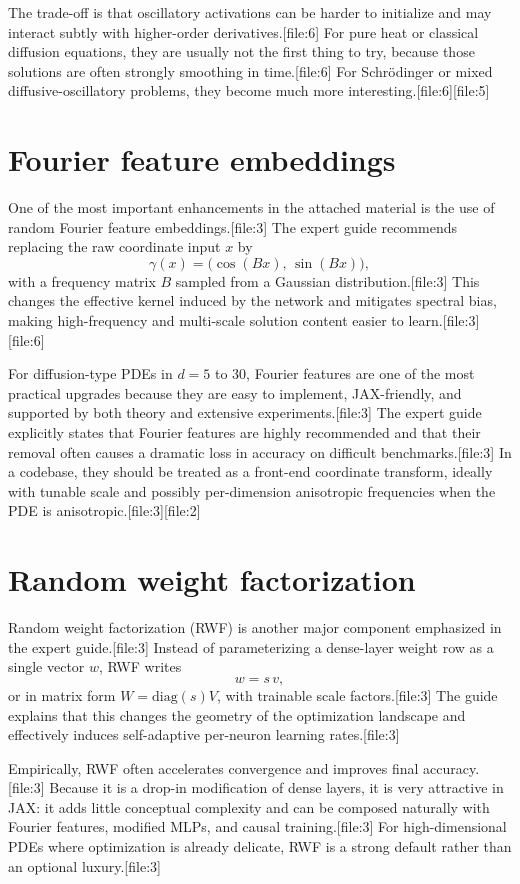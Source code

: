 \documentclass[11pt]{report}
\begin{document}
The trade-off is that oscillatory activations can be harder to initialize and may interact subtly with higher-order derivatives.[file:6]  
For pure heat or classical diffusion equations, they are usually not the first thing to try, because those solutions are often strongly smoothing in time.[file:6]  
For Schr\"odinger or mixed diffusive-oscillatory problems, they become much more interesting.[file:6][file:5]

\section{Fourier feature embeddings}

One of the most important enhancements in the attached material is the use of random Fourier feature embeddings.[file:3]  
The expert guide recommends replacing the raw coordinate input \(x\) by
\[
\gamma(x) = \bigl(\cos(Bx),\, \sin(Bx)\bigr),
\]
with a frequency matrix \(B\) sampled from a Gaussian distribution.[file:3]  
This changes the effective kernel induced by the network and mitigates spectral bias, making high-frequency and multi-scale solution content easier to learn.[file:3][file:6]

For diffusion-type PDEs in \(d=5\) to \(30\), Fourier features are one of the most practical upgrades because they are easy to implement, JAX-friendly, and supported by both theory and extensive experiments.[file:3]  
The expert guide explicitly states that Fourier features are highly recommended and that their removal often causes a dramatic loss in accuracy on difficult benchmarks.[file:3]  
In a codebase, they should be treated as a front-end coordinate transform, ideally with tunable scale and possibly per-dimension anisotropic frequencies when the PDE is anisotropic.[file:3][file:2]

\section{Random weight factorization}

Random weight factorization (RWF) is another major component emphasized in the expert guide.[file:3]  
Instead of parameterizing a dense-layer weight row as a single vector \(w\), RWF writes
\[
w = s\, v,
\]
or in matrix form \(W = \mathrm{diag}(s)V\), with trainable scale factors.[file:3]  
The guide explains that this changes the geometry of the optimization landscape and effectively induces self-adaptive per-neuron learning rates.[file:3]

Empirically, RWF often accelerates convergence and improves final accuracy.[file:3]  
Because it is a drop-in modification of dense layers, it is very attractive in JAX: it adds little conceptual complexity and can be composed naturally with Fourier features, modified MLPs, and causal training.[file:3]  
For high-dimensional PDEs where optimization is already delicate, RWF is a strong default rather than an optional luxury.[file:3]
\end{document}
